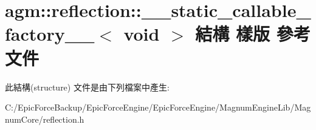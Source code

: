 \hypertarget{structagm_1_1reflection_1_1____static__callable__factory_____3_01void_01_4}{}\section{agm\+:\+:reflection\+:\+:\+\_\+\+\_\+static\+\_\+callable\+\_\+factory\+\_\+\+\_\+$<$ void $>$ 結構 樣版 參考文件}
\label{structagm_1_1reflection_1_1____static__callable__factory_____3_01void_01_4}


此結構(structure) 文件是由下列檔案中產生\+:\begin{DoxyCompactItemize}
\item 
C\+:/\+Epic\+Force\+Backup/\+Epic\+Force\+Engine/\+Epic\+Force\+Engine/\+Magnum\+Engine\+Lib/\+Magnum\+Core/reflection.\+h\end{DoxyCompactItemize}
